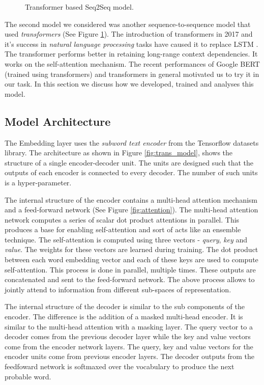 \begin{figure}[ht]
	\begin{center}
	\end{center}
	\caption{Transformer based Seq2Seq model.}
	\label{fig:trans_model_image}
\end{figure}

The second model we considered was another sequence-to-sequence model that used \emph{transformers} (See Figure \ref{fig:trans_model_image}).
The introduction of {transformers} in 2017 and it's success in \emph{natural language processing} tasks have caused it to replace LSTM \cite{DBLP:journals/corr/VaswaniSPUJGKP17}. 
The transformer performs better in retaining long-range context dependencies. 
It works on the self-attention mechanism. 
The recent performances of Google BERT (trained using transformers) and transformers in general motivated us to try it in our task.
In this section we discuss how we developed, trained and analyses this model.

\subsection{Model Architecture}

The Embedding layer uses the \emph{subword text encoder} from the Tensorflow datasets library. 
The architecture as shown in Figure \ref{fig:trans_model}, shows the structure of a single encoder-decoder unit. 
The units are designed such that the outputs of each encoder is connected to every decoder. 
The number of such units is a hyper-parameter.

The internal structure of the encoder contains a multi-head attention mechanism and a feed-forward network (See Figure \ref{fig:attention}). 
The multi-head attention network computes a series of scalar dot product attentions in parallel. 
This produces a base for enabling self-attention and sort of acts like an ensemble technique. 
The self-attention is computed using three vectors - \emph{query}, \emph{key} and \emph{value}. 
The weights for these vectors are learned during training. 
The dot product between each word embedding vector and each of these keys are used to compute self-attention. 
This process is done in parallel, multiple times. 
These outputs are concatenated and sent to the feed-forward network. 
The above process allows to jointly attend to information from different sub-spaces of representation.

The internal structure of the decoder is similar to the sub components of the encoder. 
The difference is the addition of a masked multi-head encoder. 
It is similar to the multi-head attention with a masking layer. 
The query vector to a decoder comes from the previous decoder layer while the key and value vectors come from the encoder network layers. The query, key and value vectors for the encoder units come from previous encoder layers. 
The decoder outputs from the feedfoward network is softmaxed over the vocabulary to produce the next probable word.

